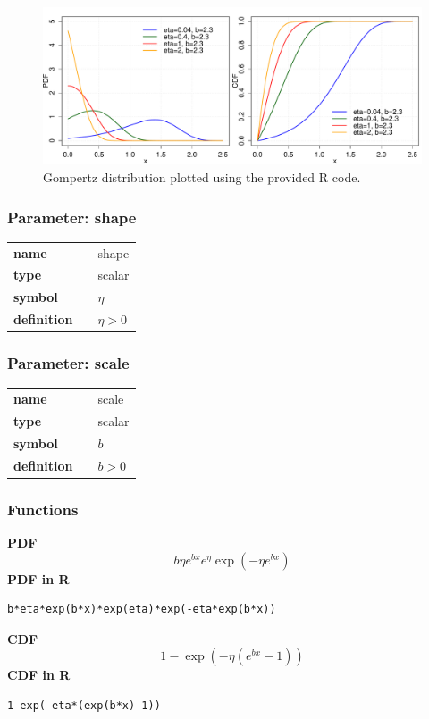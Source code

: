 \begin{figure}[ht!]
\centering
  \includegraphics[width=140mm]{pics/Gompertz.pdf}
 \caption{Gompertz distribution plotted using the provided R code.}
 \label{fig:Gompertz}
\end{figure}

\subsubsection*{Parameter: shape}

\noindent\begin{tabular}{p{2cm}cl}
\textbf{name} & & shape \\
\textbf{type} & & scalar \\
\textbf{symbol} & & $\eta$  \\
\textbf{definition} & & $\eta > 0$
\end{tabular}
\subsubsection*{Parameter: scale}

\noindent\begin{tabular}{p{2cm}cl}
\textbf{name} & & scale \\
\textbf{type} & & scalar \\
\textbf{symbol} & & $b$  \\
\textbf{definition} & & $b > 0$
\end{tabular}
\subsubsection*{Functions}

\smallskip \noindent \hspace{.2cm} \textbf{PDF} 
\begin{equation*}b\eta e^{bx}e^{\eta}\exp\left(-\eta e^{bx} \right)\end{equation*}
\smallskip \noindent \hspace{.2cm} \textbf{PDF in R}  
\begin{verbatim}b*eta*exp(b*x)*exp(eta)*exp(-eta*exp(b*x))\end{verbatim}
\smallskip \noindent \hspace{.2cm} \textbf{CDF} 
\begin{equation*}1-\exp\left(-\eta\left(e^{bx}-1 \right)\right)\end{equation*}
\smallskip \noindent \hspace{.2cm} \textbf{CDF in R} 
\begin{verbatim}1-exp(-eta*(exp(b*x)-1))\end{verbatim}
\smallskip
